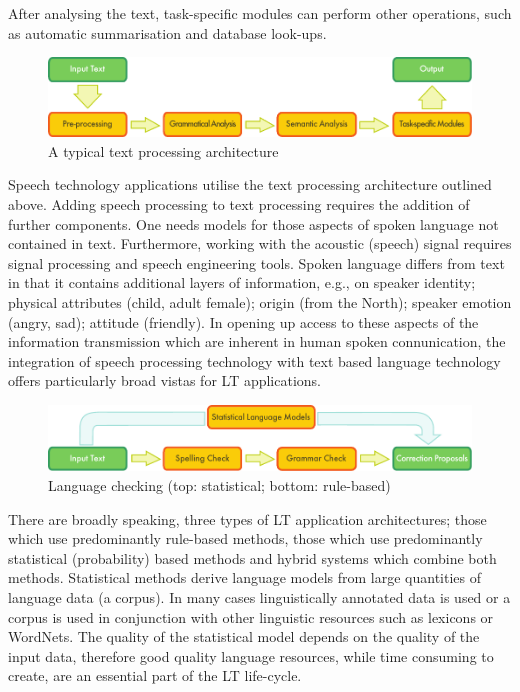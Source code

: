 \begin{multicols}{2}
After analysing the text, task-specific modules can perform other operations, such as automatic summarisation and database look-ups.

\begin{figure}[htb]
  \center
  \includegraphics[width=\textwidth]{../_media/english/text_processing_app_architecture}
  \caption{A typical text processing architecture}
  \label{fig:textprocessingarch_en}
\end{figure}

Speech technology applications utilise the text processing architecture outlined above. Adding speech processing to text processing requires the addition of further components. One needs models for those aspects of spoken  language not contained in text. Furthermore, working with the acoustic (speech) signal requires signal processing and speech engineering tools. Spoken language differs from text in that it contains additional layers of information, e.g., on speaker identity; physical attributes (child, adult female); origin (from the North); speaker emotion (angry, sad); attitude (friendly). In opening up access to these aspects of the information transmission which are inherent in human spoken connunication, the integration of speech processing technology with text based language technology offers particularly broad vistas for LT applications.

\begin{figure}[hb]
  \center
  \includegraphics[width=\textwidth]{../_media/english/language_checking}
  \caption{Language checking (top: statistical; bottom: rule-based)}
  \label{fig:langcheckingaarch_en}
\end{figure}

There are broadly speaking, three types of LT application architectures; those which use predominantly rule-based methods, those which use predominantly statistical (probability) based methods and hybrid systems which combine both methods. Statistical methods derive language models from  large quantities of language data (a corpus). In many cases linguistically annotated data is used or a corpus is used in conjunction with other linguistic resources such as lexicons or WordNets. The quality of the statistical model depends on the quality of the input data, therefore good quality language resources, while time consuming to create, are an essential part of the LT life-cycle. 


\end{multicols}
